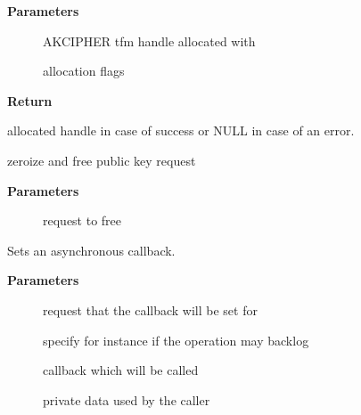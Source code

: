 \documentclass[a4paper,8pt,english]{sphinxmanual}
\begin{document}
\textbf{Parameters}
\begin{description}
\item[{}] \leavevmode
AKCIPHER tfm handle allocated with {\hyperref[crypto/api\string-akcipher:c.crypto_alloc_akcipher]{}}

\item[{}] \leavevmode
allocation flags

\end{description}

\textbf{Return}

allocated handle in case of success or NULL in case of an error.

\begin{fulllineitems}
\label{crypto/api-akcipher:c.akcipher_request_free}
zeroize and free public key request

\end{fulllineitems}


\textbf{Parameters}
\begin{description}
\item[{}] \leavevmode
request to free

\end{description}

\begin{fulllineitems}
\label{crypto/api-akcipher:c.akcipher_request_set_callback}
Sets an asynchronous callback.

\end{fulllineitems}


\textbf{Parameters}
\begin{description}
\item[{}] \leavevmode
request that the callback will be set for

\item[{}] \leavevmode
specify for instance if the operation may backlog

\item[{}] \leavevmode
callback which will be called

\item[{}] \leavevmode
private data used by the caller

\end{description}
\end{document}
